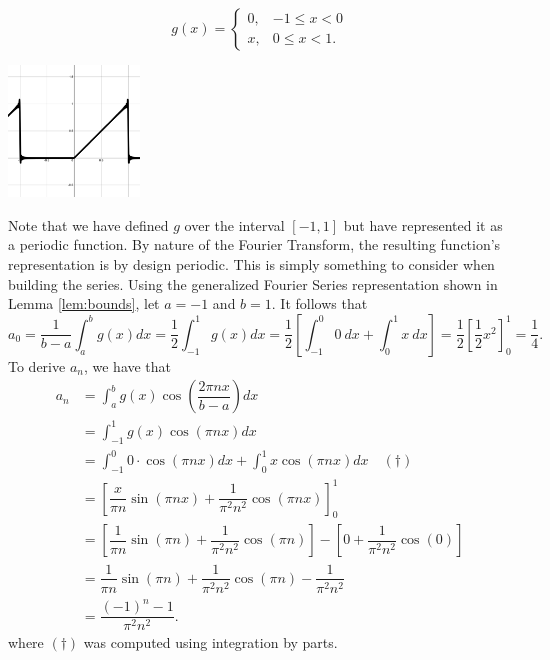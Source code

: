 \documentclass[11pt]{amsart}
\theoremstyle{plain}
\theoremstyle{definition}
\begin{document}
\begin{minipage}{0.5\textwidth}
    $$g(x) = \begin{cases}
        0, & -1 \leq x < 0 \\
        x, & 0 \leq x < 1.
    \end{cases}$$
\end{minipage}
\begin{minipage}{0.5\textwidth}
        \includegraphics[width=35mm]{Images/complex_full.png}
\end{minipage}
Note that we have defined $g$ over the interval $[-1,1]$ but have represented it as a periodic function. By nature of the Fourier Transform, the resulting function's representation is by design periodic. This is simply something to consider when building the series. Using the generalized Fourier Series representation shown in Lemma \ref{lem:bounds}, let $a=-1$ and $b=1$. It follows that $$a_0=\dfrac{1}{b-a}\int_{a}^{b}g(x)dx = \dfrac{1}{2}\int_{-1}^{1}g(x)dx= \dfrac{1}{2}\left[\int_{-1}^{0}0\ dx + \int_{0}^{1}x\ dx\right]= \dfrac{1}{2}\left[\dfrac{1}{2}x^2\right]_{0}^{1} = \dfrac{1}{4}.$$
To derive $a_n$, we have that
\begin{align*}
    a_n &= \int_{a}^{b}g(x)\cos\left(\dfrac{2\pi nx}{b-a}\right)dx\\
        &= \int_{-1}^{1}g(x)\cos\left(\pi nx\right)dx\\
        &= \int_{-1}^{0}0\cdot\cos\left(\pi nx\right)dx + \int_{0}^{1}x\cos\left(\pi nx\right)dx\quad (\dagger)\\
        &= \left[\dfrac{x}{\pi n}\sin(\pi nx) + \dfrac{1}{\pi^2 n^2}\cos(\pi nx)\right]_0^1\\
        &= \left[\dfrac{1}{\pi n}\sin(\pi n) + \dfrac{1}{\pi^2 n^2}\cos(\pi n)\right] - \left[0 + \dfrac{1}{\pi^2 n^2}\cos(0)\right]\\
        &= \dfrac{1}{\pi n}\sin(\pi n) + \dfrac{1}{\pi^2 n^2}\cos(\pi n) -\dfrac{1}{\pi^2 n^2}\\
        &= \dfrac{(-1)^n-1}{\pi^2 n^2}.
\end{align*}
where $(\dagger)$ was computed using integration by parts. 
\end{document}
